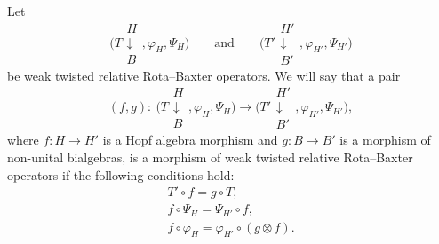 \documentclass[pdftex]{sigma}
\numberwithin{equation}{section}
\begin{document}
\begin{Definition}
Let
\[
\Biggl(T\begin{array}{c}H\\\downarrow\\B\end{array},\varphi_{H},\Psi_{H}\Biggr) \qquad \text{and} \qquad \Biggl(T'\begin{array}{c}H'\\\downarrow\\B'\end{array},\varphi_{H'},\Psi_{H'}\Biggr)
\] be weak twisted relative Rota--Baxter operators. We will say that a pair
\[
(f,g)\colon \ \Biggl(T\begin{array}{c}H\\\downarrow\\B\end{array},\varphi_{H},\Psi_{H}\Biggr)\rightarrow \Biggl(T'\begin{array}{c}H'\\\downarrow\\B'\end{array},\varphi_{H'},\Psi_{H'}\Biggr),
\]
where $f\colon H\rightarrow H'$ is a Hopf algebra morphism and $g\colon B\rightarrow B'$ is a morphism of non-unital bialgebras, is a morphism of weak twisted relative Rota--Baxter operators if the following conditions hold:
\begin{gather}
\label{mor0twrRb}
T'\circ f=g\circ T,\\
\label{mor1twrRb}
f\circ \Psi_{H}=\Psi_{H'}\circ f,\\
\label{mor2.0twrRb}
f\circ \varphi_{H}=\varphi_{H'}\circ(g\otimes f).
\end{gather}
\end{Definition}
\end{document}
